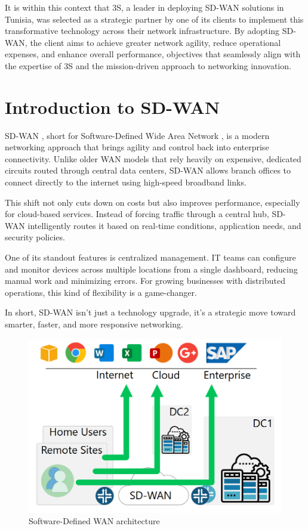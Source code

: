 \documentclass[12pt,english]{report}
\begin{document}
It is within this context that 3S, a leader in deploying SD-WAN solutions in Tunisia, was selected as a strategic partner by one of its clients to implement this transformative technology across their network infrastructure. By adopting SD-WAN, the client aims to achieve greater network agility, reduce operational expenses, and enhance overall performance, objectives that seamlessly align with the expertise of 3S and the mission-driven approach to networking innovation\cite{ref1}.

\section{Introduction to SD-WAN}
SD-WAN , short for Software-Defined Wide Area Network , is a modern networking approach that brings agility and control back into enterprise connectivity. Unlike older WAN models that rely heavily on expensive, dedicated circuits routed through central data centers, SD-WAN allows branch offices to connect directly to the internet using high-speed broadband links.

This shift not only cuts down on costs but also improves performance, especially for cloud-based services. Instead of forcing traffic through a central hub, SD-WAN intelligently routes it based on real-time conditions, application needs, and security policies.

One of its standout features is centralized management. IT teams can configure and monitor devices across multiple locations from a single dashboard, reducing manual work and minimizing errors. For growing businesses with distributed operations, this kind of flexibility is a game-changer.

In short, SD-WAN isn’t just a technology upgrade, it's a strategic move toward smarter, faster, and more responsive networking\cite{ref3}.
\begin{figure}[H]
    \centering
    \includegraphics[width= 1 \textwidth]{chapter1/sdwan-intro.png}
    \caption{Software-Defined WAN architecture \cite{ref3}}
    \label{fig: Software-Defined WAN architecture}
\end{figure}
\end{document}
